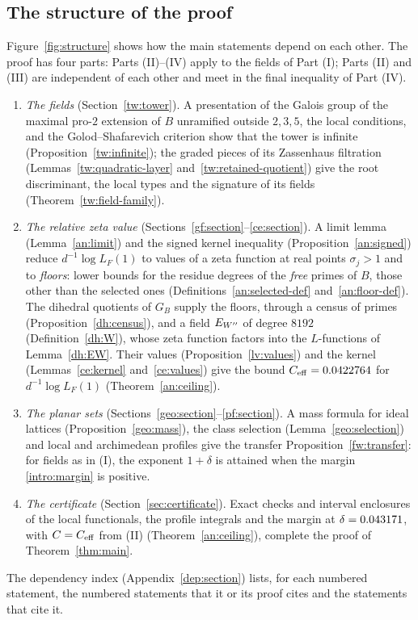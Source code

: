 \subsection{The structure of the proof}\label{intro:structure}
Figure~\ref{fig:structure} shows how the main statements depend on each
other. The proof has four parts: Parts (II)--(IV) apply to the fields of
Part (I); Parts (II) and (III) are independent of each other and meet in
the final inequality of Part (IV).
\begin{enumerate}
\item[(I)] \emph{The fields} (Section~\ref{tw:tower}). A presentation of the
 Galois group of the maximal pro-$2$ extension of $B$ unramified outside
 $2,3,5$, the local conditions, and the Golod--Shafarevich criterion show
 that the tower is infinite (Proposition~\ref{tw:infinite}); the graded
 pieces of its Zassenhaus filtration (Lemmas~\ref{tw:quadratic-layer}
 and~\ref{tw:retained-quotient}) give the root discriminant, the local
 types and the signature of its fields (Theorem~\ref{tw:field-family}).
\item[(II)] \emph{The relative zeta value} (Sections~\ref{gf:section}--\ref{ce:section}).
 A limit lemma (Lemma~\ref{an:limit}) and the signed kernel inequality
 (Proposition~\ref{an:signed}) reduce $d^{-1}\log L_F(1)$ to values of a zeta
 function at real points $\sigma_j>1$ and to \emph{floors}: lower bounds for
 the residue degrees of the \emph{free} primes of $B$, those other than the
 selected ones (Definitions~\ref{an:selected-def} and~\ref{an:floor-def}). The
 dihedral quotients of $G_B$ supply the floors, through a census of primes
 (Proposition~\ref{dh:census}), and a field $E_{W''}$ of degree $8192$
 (Definition~\ref{dh:W}), whose zeta function factors into the
 $L$-functions of Lemma~\ref{dh:EW}. Their values
 (Proposition~\ref{lv:values}) and the kernel (Lemmas~\ref{ce:kernel}
 and~\ref{ce:values}) give the bound $C_{\rm eff}=0.0422764$ for
 $d^{-1}\log L_F(1)$ (Theorem~\ref{an:ceiling}).
\item[(III)] \emph{The planar sets} (Sections~\ref{geo:section}--\ref{pf:section}).
 A mass formula for ideal lattices (Proposition~\ref{geo:mass}), the class
 selection (Lemma~\ref{geo:selection}) and local and archimedean profiles
 give the transfer Proposition~\ref{fw:transfer}: for fields as in (I), the
 exponent $1+\delta$ is attained when the margin \eqref{intro:margin} is
 positive.
\item[(IV)] \emph{The certificate} (Section~\ref{sec:certificate}). Exact
 checks and interval enclosures of the local functionals, the profile
 integrals and the margin at $\delta=0.043171$, with $C=C_{\rm eff}$ from
 (II) (Theorem~\ref{an:ceiling}), complete the proof of Theorem~\ref{thm:main}.
\end{enumerate}
The dependency index (Appendix~\ref{dep:section}) lists, for each numbered
statement, the numbered statements that it or its proof cites and the
statements that cite it.

